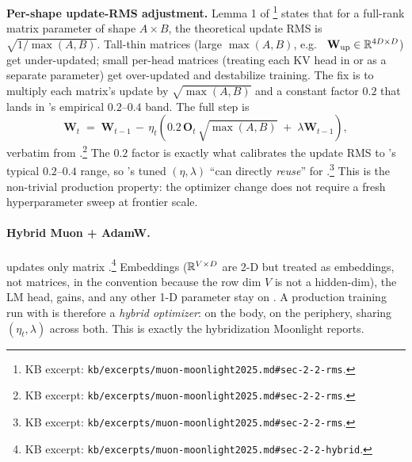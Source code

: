 \textbf{Per-shape update-RMS adjustment.} Lemma 1 of
\citet[\S 2.2]{muon-moonlight2025}\footnote{KB excerpt:
\nolinkurl{kb/excerpts/muon-moonlight2025.md#sec-2-2-rms}.} states that
for a full-rank matrix parameter of shape $A \times B$, the
theoretical  update RMS is $\sqrt{1/\max(A, B)}$. Tall-thin
matrices (large $\max(A, B)$, e.g.\  $\mathbf{W}_{\text{up}} \in
\mathbb{R}^{4D \times D}$) get under-updated; small per-head matrices
(treating each KV head in  \citep{ainslie2023} or 
\citep{deepseek-v2} as a separate parameter) get over-updated and
destabilize training. The fix is to multiply each matrix's update by
$\sqrt{\max(A, B)}$ and a constant factor $0.2$ that lands in 's
empirical $0.2$--$0.4$ band. The full step is
\begin{equation}
\mathbf{W}_t \;=\; \mathbf{W}_{t-1} \,-\, \eta_t \!\left(
   0.2 \,\mathbf{O}_t \,\sqrt{\max(A, B)} \;+\; \lambda \mathbf{W}_{t-1}
\right),
\label{eq:muon-final}
\tag{4'}
\end{equation}
verbatim from \citet[\S 2.2, eq.\ 4]{muon-moonlight2025}.\footnote{KB
excerpt: \nolinkurl{kb/excerpts/muon-moonlight2025.md#sec-2-2-rms}.}
The $0.2$ factor is exactly what calibrates the update RMS to 's
typical $0.2$--$0.4$ range, so 's tuned $(\eta, \lambda)$ ``can
directly \emph{reuse}'' for  \citep[\S
2.2]{muon-moonlight2025}.\footnote{KB excerpt:
\nolinkurl{kb/excerpts/muon-moonlight2025.md#sec-2-2-rms}.} This is the
non-trivial production property: the optimizer change does not
require a fresh hyperparameter sweep at frontier scale.

\paragraph{Hybrid Muon + AdamW.}
 updates only matrix  \citep[\S
2.2]{muon-moonlight2025}.\footnote{KB excerpt:
\nolinkurl{kb/excerpts/muon-moonlight2025.md#sec-2-2-hybrid}.}
Embeddings ($\mathbb{R}^{V \times D}$ are 2-D but treated as embeddings, not
matrices, in the  convention because the row dim $V$ is not a
hidden-dim), the LM head,  gains, and any other 1-D parameter
stay on . A production training run with  is therefore a
\emph{hybrid optimizer}:  on the body,  on the periphery,
sharing $(\eta_t, \lambda)$ across both. This is exactly the
hybridization Moonlight \citep[\S 3]{muon-moonlight2025} reports.

